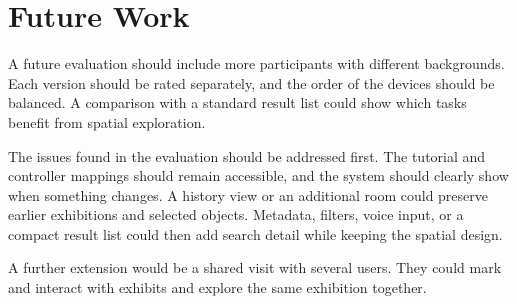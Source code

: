 \section{Future Work}

A future evaluation should include more participants with different backgrounds. Each version should be rated separately, and the order of the devices should be balanced. A comparison with a standard result list could show which tasks benefit from spatial exploration.

The issues found in the evaluation should be addressed first. The tutorial and controller mappings should remain accessible, and the system should clearly show when something changes. A history view or an additional room could preserve earlier exhibitions and selected objects. Metadata, filters, voice input, or a compact result list could then add search detail while keeping the spatial design.

A further extension would be a shared visit with several users. They could mark and interact with exhibits and explore the same exhibition together.
\endgroup
